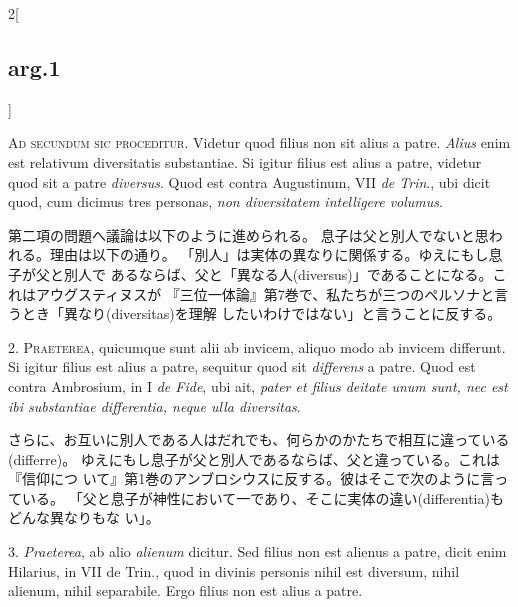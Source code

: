 \documentclass[paper=a4paper,fontsize=10pt,jafontsize=9pt,titlepage]{jlreq}
\begin{document}
{}
\setcounter{section}{2}
\setcounter{subsection}{0}

\begin{paracol}{2}[\subsection{arg.1}]

{\scshape Ad secundum sic proceditur}. Videtur quod filius non sit alius a
patre. {\itshape Alius} enim est relativum diversitatis substantiae. Si igitur
filius est alius a patre, videtur quod sit a patre {\itshape diversus}. Quod est
contra Augustinum, VII {\itshape de Trin}., ubi dicit quod, cum dicimus tres
personas, {\itshape non diversitatem intelligere volumus}.

\switchcolumn

第二項の問題へ議論は以下のように進められる。
息子は父と別人でないと思われる。理由は以下の通り。
「別人」は実体の異なりに関係する。ゆえにもし息子が父と別人で
 あるならば、父と「異なる人(diversus)」であることになる。これはアウグスティヌスが
 『三位一体論』第7巻で、私たちが三つのペルソナと言うとき「異なり(diversitas)を理解
 したいわけではない」と言うことに反する。


2. {\scshape Praeterea}, quicumque sunt alii ab invicem, aliquo modo ab invicem
differunt. Si igitur filius est alius a patre, sequitur quod sit
{\itshape differens} a patre. Quod est contra Ambrosium, in I {\itshape de Fide}, ubi ait,
{\itshape pater et filius deitate unum sunt, nec est ibi substantiae
differentia, neque ulla diversitas}.

\switchcolumn

さらに、お互いに別人である人はだれでも、何らかのかたちで相互に違っている(differre)。
 ゆえにもし息子が父と別人であるならば、父と違っている。これは『信仰につ
 いて』第1巻のアンブロシウスに反する。彼はそこで次のように言っている。
 「父と息子が神性において一であり、そこに実体の違い(differentia)もどんな異なりもな
 い」。


3. {\itshape Praeterea}, ab alio {\itshape alienum} dicitur. Sed filius non est alienus a
patre, dicit enim Hilarius, in VII de Trin., quod in divinis personis
nihil est diversum, nihil alienum, nihil separabile. Ergo filius non
est alius a patre.


\end{paracol}
\end{document}
